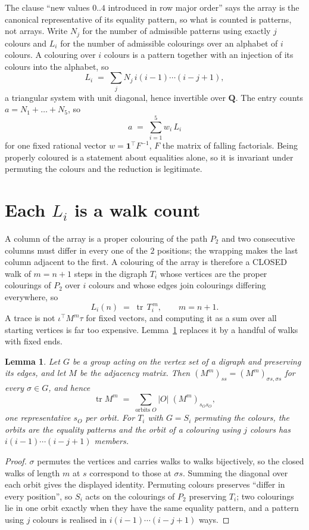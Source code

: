 \documentclass[11pt,a4paper]{article}
\theoremstyle{plain}
\newtheorem{lemma}[theorem]{Lemma}
\theoremstyle{definition}
\begin{document}
The clause ``new values $0..4$ introduced in row major order'' says the array is the
canonical representative of its equality pattern, so what is counted is patterns, not arrays.
Write $N_j$ for the number of admissible patterns using exactly $j$ colours and $L_i$ for the
number of admissible colourings over an alphabet of $i$ colours. A colouring over $i$ colours
is a pattern together with an injection of its colours into the alphabet, so
\[
L_i\;=\;\sum_j N_j\,i(i-1)\cdots(i-j+1),
\]
a triangular system with unit diagonal, hence invertible over $\mathbf{Q}$. The entry counts
$a=N_1+\dots+N_{5}$, so
\[
a\;=\;\sum_{i=1}^{5}w_i\,L_i
\]
for one fixed rational vector $w=\mathbf{1}^{\!\top}F^{-1}$, $F$ the matrix of falling
factorials. Being properly coloured is a statement about equalities alone, so it is invariant
under permuting the colours and the reduction is legitimate.

\section{Each $L_i$ is a walk count}

A column of the array is a proper colouring of the path $P_{2}$ and two consecutive
columns must differ in every one of the $2$ positions; the wrapping makes the last column
adjacent to the first. A colouring of the array is therefore a CLOSED walk of $m=n+1$ steps
in the digraph $T_i$ whose vertices are the proper colourings of $P_{2}$ over $i$ colours
and whose edges join colourings differing everywhere, so
\[
L_i(n)\;=\;\operatorname{tr}\,T_i^{\,m},\qquad m=n+1.
\]
A trace is not $\iota^{\!\top}M^m\tau$ for fixed vectors, and computing it as a sum over all
starting vertices is far too expensive. Lemma~\ref{lem:trace} replaces it by a handful of
walks with fixed ends.

\begin{lemma}\label{lem:trace}
Let $G$ be a group acting on the vertex set of a digraph and preserving its edges, and let $M$
be the adjacency matrix. Then $(M^m)_{ss}=(M^m)_{\sigma s,\sigma s}$ for every
$\sigma\in G$, and hence
\[
\operatorname{tr} M^m\;=\;\sum_{\text{orbits }O}|O|\;(M^m)_{s_O s_O} ,
\]
one representative $s_O$ per orbit. For $T_i$ with $G=S_i$ permuting the colours, the orbits
are the equality patterns and the orbit of a colouring using $j$ colours has
$i(i-1)\cdots(i-j+1)$ members.
\end{lemma}

\begin{proof}
$\sigma$ permutes the vertices and carries walks to walks bijectively, so the closed walks of
length $m$ at $s$ correspond to those at $\sigma s$. Summing the diagonal over each orbit
gives the displayed identity. Permuting colours preserves ``differ in every position'', so
$S_i$ acts on the colourings of $P_{2}$ preserving $T_i$; two colourings lie in one orbit
exactly when they have the same equality pattern, and a pattern using $j$ colours is realised
in $i(i-1)\cdots(i-j+1)$ ways.
\end{proof}
\end{document}
